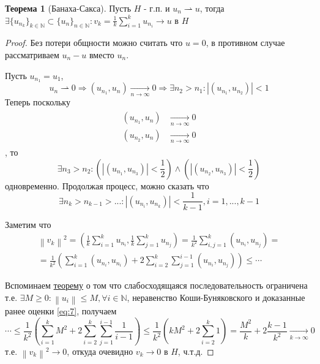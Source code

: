 \documentclass[12pt,a4paper]{article}
\theoremstyle{definition}
\newtheorem{theorem}{Теорема}
\newcommand{\Natural}{\mathbb{N}}
\newcommand{\norm}[1]{\left\lVert#1\right\rVert}
\newcommand{\seq}[2]{\{#1\}_{#2}}
\newcommand{\weakto}{\rightharpoonup}
\begin{document}
\begin{theorem}[Банаха-Сакса]
	Пусть $H$ - г.п. и $u_n \weakto u$, тогда \\ $\exists\seq{u_{n_k}}{k\in\Natural} \subset \seq{u_n}{n\in\Natural}: v_k = \frac{1}{k}\sum\limits_{i=1}^{k}{u_{n_i}} \to u$ в $H$
\end{theorem}
\begin{proof}
	Без потери общности можно считать что $u = 0$, в противном случае рассматриваем $u_n - u$ вместо $u_n$. 
	
	Пусть $u_{n_1} = u_1$, 
	$$u_n \weakto 0 \Rightarrow (u_{n_1}, u_n) \xrightarrow[n \to \infty]{} 0 \Rightarrow \exists n_2 > n_1: |(u_{n_1}, u_{n_2})| < 1$$
	Теперь поскольку
	\begin{align*}
	\begin{split}
		(u_{n_1}, u_n) &\xrightarrow[n \to \infty]{} 0 \\
		(u_{n_2}, u_n) &\xrightarrow[n \to \infty]{} 0
	\end{split}
	\end{align*}
	, то 
	$$\exists n_3 > n_2: \left( |(u_{n_1}, u_{n_3})| < \frac{1}{2} \right) \wedge \left( |(u_{n_2}, u_{n_3})| < \frac{1}{2} \right)$$
	одновременно. Продолжая процесс, можно сказать что 
	\begin{equation}\label{eq:7}
		\exists n_k > n_{k-1} > ...: |(u_{n_i}, u_{n_k})| < \frac{1}{k-1}, i = 1, ..., k-1
	\end{equation}
	
	Заметим что
	\begin{multline*}
		\norm{v_k}^2 = \left(\frac{1}{k} \sum_{i=1}^{k}{u_{n_i}}, \frac{1}{k} \sum_{j=1}^{k}{u_{n_j}} \right) = \frac{1}{k^2}\sum_{i,j=1}^{k}{(u_{n_i}, u_{n_j})} = \\ = \frac{1}{k^2}\left( \sum_{i=1}^{k}{(u_{n_i}, u_{n_i})} + 2\sum_{i=2}^{k}{\sum_{j=1}^{i-1}{(u_{n_i}, u_{n_j})}} \right) \leq \cdots
	\end{multline*}
	
	Вспоминаем \hyperref[th:5]{теорему} о том что слабосходящаяся последовательность ограничена т.е. $\exists M \geq 0: \norm{u_i} \leq M, \forall i \in \Natural$, неравенство Коши-Буняковского и доказанные ранее оценки \eqref{eq:7}, получаем
	\begin{equation*}
		\cdots \leq \frac{1}{k^2}\left(\sum_{i=1}^{k}{M^2} + 2\sum_{i=2}^{k}{\sum_{j=1}^{i-1}{\frac{1}{i-1}}}\right) \leq
		\frac{1}{k^2}\left( kM^2 + 2\sum_{i=2}^{k}{1}\right) = \frac{M^2}{k} + 2\frac{k-1}{k^2} \xrightarrow[k \to \infty]{} 0
	\end{equation*}
	т.е. $\norm{v_k}^2 \to 0$, откуда очевидно $v_k \to 0$ в $H$, ч.т.д.
\end{proof}

\newpage
\renewcommand{\listtheoremname}{Список теорем и утверждений}
\listoftheorems[ignoreall, show={theorem,corollary}]
\end{document}
